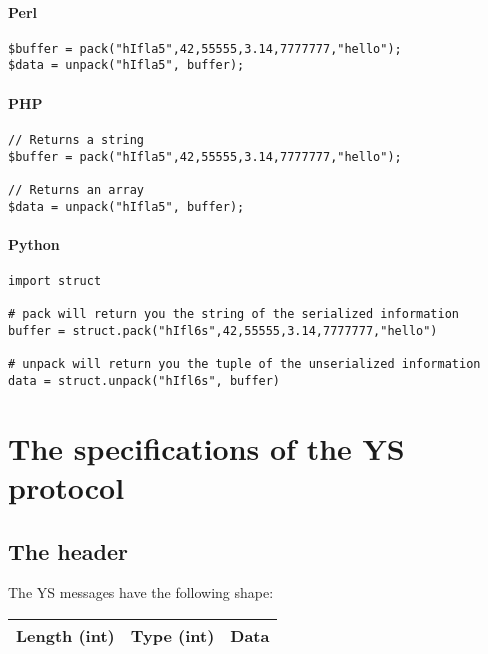 \documentclass{article}
\begin{document}
\paragraph{Perl}

\begin{verbatim}
$buffer = pack("hIfla5",42,55555,3.14,7777777,"hello");
$data = unpack("hIfla5", buffer);
\end{verbatim}

\paragraph{PHP}

\begin{verbatim}
// Returns a string
$buffer = pack("hIfla5",42,55555,3.14,7777777,"hello");

// Returns an array
$data = unpack("hIfla5", buffer);
\end{verbatim}

\paragraph{Python}

\begin{verbatim}	
import struct

# pack will return you the string of the serialized information
buffer = struct.pack("hIfl6s",42,55555,3.14,7777777,"hello")

# unpack will return you the tuple of the unserialized information
data = struct.unpack("hIfl6s", buffer)
\end{verbatim}




\clearpage

\section{The specifications of the YS protocol}

\subsection{The header}

The YS messages have the following shape: \\

\begin{tabularx}{8cm}{|X|X|X|}
\hline
Length (int) & Type (int) & Data \\
\hline
\end{tabularx}
\end{document}

